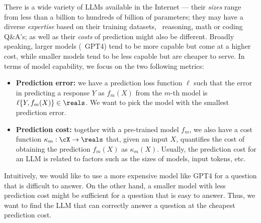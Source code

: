 

There is a wide variety of LLMs available in the Internet --- their \emph{sizes} range from less than a billion to hundreds of billion of parameters; they may have a diverse \emph{expertise} based on their training datasets, \eg\ reasoning, math or coding Q\&A's; as well as their \emph{costs} of prediction might also be different. Broadly speaking, larger models (\eg\ GPT4) tend to be more capable but
come at a higher cost, while smaller models tend to be less capable but are cheaper to serve. 
In terms of model capability, we focus on the two following metrics: 
\begin{itemize}
    \item {\bf Prediction error:} we have a prediction loss function $\ell$ such that the error in predicting a response $Y$  as $f_m(X)$ from the $m$-th model is $\ell\{Y, f_m(X)\} \in \reals$. We want to pick the model with the smallest prediction error. 
    \item {\bf Prediction cost:} together with a pre-trained model $f_m$, we also have a cost function $\kappa_m: \cX \to \reals$ that, given an input $X$, quantifies the cost of obtaining the prediction $f_m(X)$ as $\kappa_m(X)$. Usually, the prediction cost for an LLM is related to factors such as the sizes of models, input tokens, etc. 
\end{itemize}
Intuitively, we would like to use a more expensive model like GPT4 for a question that is difficult to answer. On the other hand, a smaller model with less prediction cost might be sufficient for a question that is easy to answer. Thus, we want to find the LLM that can correctly answer a question at the cheapest prediction cost. 




